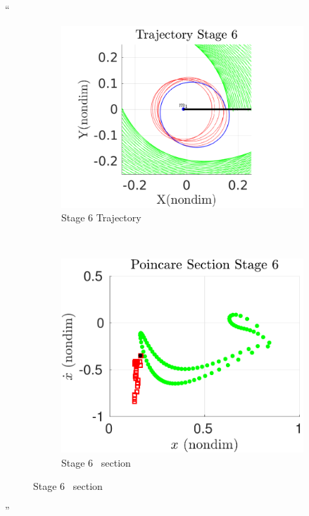 \documentclass[11pt]{article}
\newenvironment{correction}{\begin{list}{}{\setlength{\leftmargin}{1cm}\setlength{\rightmargin}{1cm}}\vspace{\parsep}\item[]``}{''\end{list}}
\begin{document}
\begin{enumerate}
\begin{correction}
\begin{figure}[H]
    \begin{subfigure}[htbp]{0.2\textwidth} 
        \includegraphics[width=\textwidth, keepaspectratio]{figures/geo_transfer/stage6_trajectory_zoom.pdf} 
        \caption{Stage 6 Trajectory} 
    \end{subfigure}~
    \begin{subfigure}[htbp]{0.2\textwidth} 
        \includegraphics[width=\textwidth, keepaspectratio]{figures/geo_transfer/stage6_poincare.pdf} 
        \caption{Stage 6 \Poincare~section } 
    \end{subfigure}


\end{figure}
\end{correction}
\end{enumerate}
\end{document}
